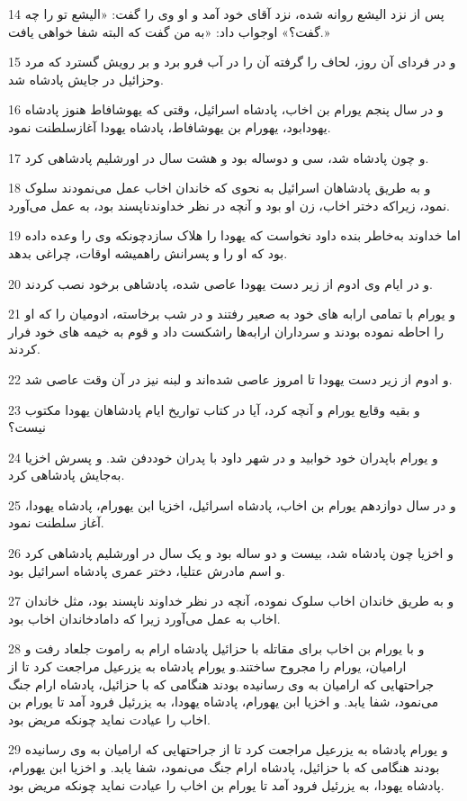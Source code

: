 \par 14 پس از نزد الیشع روانه شده، نزد آقای خود آمد و او وی را گفت: «الیشع تو را چه گفت؟» اوجواب داد: «به من گفت که البته شفا خواهی یافت.»
\par 15 و در فردای آن روز، لحاف را گرفته آن را در آب فرو برد و بر رویش گسترد که مرد وحزائیل در جایش پادشاه شد.
\par 16 و در سال پنجم یورام بن اخاب، پادشاه اسرائیل، وقتی که یهوشافاط هنوز پادشاه یهودابود، یهورام بن یهوشافاط، پادشاه یهودا آغازسلطنت نمود.
\par 17 و چون پادشاه شد، سی و دوساله بود و هشت سال در اورشلیم پادشاهی کرد.
\par 18 و به طریق پادشاهان اسرائیل به نحوی که خاندان اخاب عمل می‌نمودند سلوک نمود، زیراکه دختر اخاب، زن او بود و آنچه در نظر خداوندناپسند بود، به عمل می‌آورد.
\par 19 اما خداوند به‌خاطر بنده داود نخواست که یهودا را هلاک سازدچونکه وی را وعده داده بود که او را و پسرانش راهمیشه اوقات، چراغی بدهد. 
\par 20 و در ایام وی ادوم از زیر دست یهودا عاصی شده، پادشاهی برخود نصب کردند.
\par 21 و یورام با تمامی ارابه های خود به صعیر رفتند و در شب برخاسته، ادومیان را که او را احاطه نموده بودند و سرداران ارابه‌ها راشکست داد و قوم به خیمه های خود فرار کردند.
\par 22 و ادوم از زیر دست یهودا تا امروز عاصی شده‌اند و لبنه نیز در آن وقت عاصی شد.
\par 23 و بقیه وقایع یورام و آنچه کرد، آیا در کتاب تواریخ ایام پادشاهان یهودا مکتوب نیست؟
\par 24 و یورام باپدران خود خوابید و در شهر داود با پدران خوددفن شد. و پسرش اخزیا به‌جایش پادشاهی کرد.
\par 25 و در سال دوازدهم یورام بن اخاب، پادشاه اسرائیل، اخزیا ابن یهورام، پادشاه یهودا، آغاز سلطنت نمود.
\par 26 و اخزیا چون پادشاه شد، بیست و دو ساله بود و یک سال در اورشلیم پادشاهی کرد و اسم مادرش عتلیا، دختر عمری پادشاه اسرائیل بود.
\par 27 و به طریق خاندان اخاب سلوک نموده، آنچه در نظر خداوند ناپسند بود، مثل خاندان اخاب به عمل می‌آورد زیرا که دامادخاندان اخاب بود.
\par 28 و با یورام بن اخاب برای مقاتله با حزائیل پادشاه ارام به راموت جلعاد رفت و ارامیان، یورام را مجروح ساختند.و یورام پادشاه به یزرعیل مراجعت کرد تا از جراحتهایی که ارامیان به وی رسانیده بودند هنگامی که با حزائیل، پادشاه ارام جنگ می‌نمود، شفا یابد. و اخزیا ابن یهورام، پادشاه یهودا، به یزرئیل فرود آمد تا یورام بن اخاب را عیادت نماید چونکه مریض بود.
\par 29 و یورام پادشاه به یزرعیل مراجعت کرد تا از جراحتهایی که ارامیان به وی رسانیده بودند هنگامی که با حزائیل، پادشاه ارام جنگ می‌نمود، شفا یابد. و اخزیا ابن یهورام، پادشاه یهودا، به یزرئیل فرود آمد تا یورام بن اخاب را عیادت نماید چونکه مریض بود.
 
